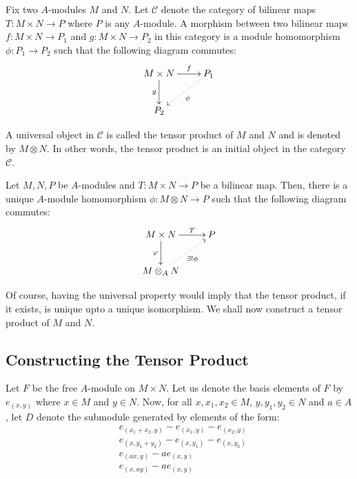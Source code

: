 Fix two $A$-modules $M$ and $N$. Let $\mathscr C$ denote the category of bilinear maps $T: M\times N\to P$ where $P$ is any $A$-module. A morphism between two bilinear maps $f: M\times N\to P_1$ and $g: M\times N\to P_2$ in this category is a module homomorphism $\phi: P_1\to P_2$ such that the following diagram commutes: 
\begin{equation*}
\xymatrix {
    M\times N\ar[r]^-f\ar[d]_g & P_1\ar@{.>}[ld]^\phi\\
    P_2
}
\end{equation*}

A universal object in $\mathscr C$ is called the tensor product of $M$ and $N$ and is denoted by $M\otimes N$. In other words, the tensor product is an initial object in the category $\mathscr C$.

\begin{definition}
    Let $M,N,P$ be $A$-modules and $T: M\times N\to P$ be a bilinear map. Then, there is a unique $A$-module homomorphism $\phi: M\otimes N\to P$ such that the following diagram commutes: 
    \begin{equation*}
    \xymatrix {
        M\times N\ar[r]^-T\ar[d]_\varphi & P\\
        M\otimes_A N\ar@{.>}[ru]_{\exists!\phi}
    }
    \end{equation*}
\end{definition}

Of course, having the universal property would imply that the tensor product, if it exists, is unique upto a unique isomorphism. We shall now construct a tensor product of $M$ and $N$.

\subsection*{Constructing the Tensor Product}

Let $F$ be the free $A$-module on $M\times N$. Let us denote the basis elements of $F$ by $e_{(x,y)}$ where $x\in M$ and $y\in N$. Now, for all $x,x_1,x_2\in M$, $y,y_1,y_2\in N$ and $a\in A$, let $D$ denote the submodule generated by elements of the form: 
\begin{align*}
    &e_{(x_1 + x_2, y)} - e_{(x_1,y)} - e_{(x_2,y)}\\
    &e_{(x,y_1 + y_2)} - e_{(x,y_1)} - e_{(x,y_2)}\\
    &e_{(ax,y)} - ae_{(x,y)}\\
    &e_{(x,ay)} - ae_{(x,y)}
\end{align*}

